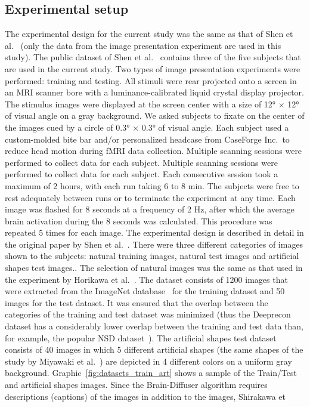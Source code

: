 \subsection{Experimental setup}
The experimental design for the current study was the same as that of Shen et al.~\cite{shenDeepImageReconstruction2019} (only the data from the image presentation experiment are used in this study). The public dataset of Shen et al.~\cite{ds001506:1.3.1} contains three of the five subjects that are used in the current study.  Two types of image presentation experiments were performed: training and testing. All stimuli were rear projected onto a screen in an MRI scanner bore with a luminance-calibrated liquid crystal display projector. The stimulus images were displayed at the screen center with a size of 12° $\times$ 12° of visual angle on a gray background. We asked subjects to fixate on the center of the images cued by a circle of 0.3° $\times$ 0.3° of visual angle. Each subject used a custom-molded bite bar and/or personalized headcase from CaseForge Inc.\ to reduce head motion during fMRI data collection. Multiple scanning sessions were performed to collect data for each subject. Multiple scanning sessions were performed to collect data for each subject. Each consecutive session took a maximum of 2 hours, with each run taking 6 to 8 min. The subjects were free to rest adequately between runs or to terminate the experiment at any time. Each image was flashed for 8 seconds at a frequency of 2 Hz, after which the average brain activation during the 8 seconds was calculated. This procedure was repeated 5 times for each image. The experimental design is described in detail in the original paper by Shen et al.~\cite{shenDeepImageReconstruction2019}. There were three different categories of images shown to the subjects: natural training images, natural test images and artificial shapes test images.. The selection of natural images was the same as that used in the experiment by Horikawa et al.~\cite{horikawaGenericDecodingSeen2017}. The dataset consists of 1200 images that were extracted from the ImageNet database~\cite{dengImageNetLargescaleHierarchical2009} for the training dataset and 50 images for the test dataset. It was ensured that the overlap between the categories of the training and test dataset was minimized (thus the Deeprecon dataset has a considerably lower overlap between the training and test data than, for example, the popular NSD dataset~\cite{allenMassive7TFMRI2022,shirakawaSpuriousReconstructionBrain2024}). The artificial shapes test dataset consists of 40 images in which 5 different artificial shapes (the same shapes of the study by Miyawaki et al.~\cite{miyawakiVisualImageReconstruction2008}) are depicted in 4 different colors on a uniform gray background. Graphic~\ref{fig:datasets_train_art} shows a sample of the Train/Test and artificial shapes images. Since the Brain-Diffuser algorithm requires descriptions (captions) of the images in addition to the images, Shirakawa et 